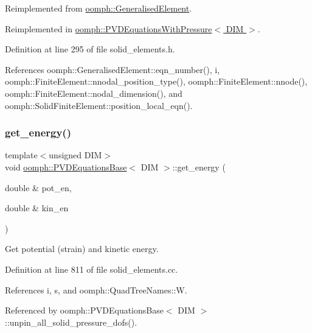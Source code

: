 Reimplemented from \hyperlink{classoomph_1_1GeneralisedElement_a069f59bfc3e607a5bebba52c6314d777}{oomph\+::\+Generalised\+Element}.



Reimplemented in \hyperlink{classoomph_1_1PVDEquationsWithPressure_a46331a93e6ac8cff7b4badad1c7a7a03}{oomph\+::\+P\+V\+D\+Equations\+With\+Pressure$<$ D\+I\+M $>$}.



Definition at line 295 of file solid\+\_\+elements.\+h.



References oomph\+::\+Generalised\+Element\+::eqn\+\_\+number(), i, oomph\+::\+Finite\+Element\+::nnodal\+\_\+position\+\_\+type(), oomph\+::\+Finite\+Element\+::nnode(), oomph\+::\+Finite\+Element\+::nodal\+\_\+dimension(), and oomph\+::\+Solid\+Finite\+Element\+::position\+\_\+local\+\_\+eqn().

\mbox{\label{classoomph_1_1PVDEquationsBase_a117549617e09065f0186e79cf9470e09}} 
\subsubsection{\texorpdfstring{get\+\_\+energy()}{get\_energy()}}
{\footnotesize\ttfamily template$<$unsigned D\+IM$>$ \\
void \hyperlink{classoomph_1_1PVDEquationsBase}{oomph\+::\+P\+V\+D\+Equations\+Base}$<$ D\+IM $>$\+::get\+\_\+energy (\begin{DoxyParamCaption}\item[{double \&}]{pot\+\_\+en,  }\item[{double \&}]{kin\+\_\+en }\end{DoxyParamCaption})}



Get potential (strain) and kinetic energy. 



Definition at line 811 of file solid\+\_\+elements.\+cc.



References i, s, and oomph\+::\+Quad\+Tree\+Names\+::W.



Referenced by oomph\+::\+P\+V\+D\+Equations\+Base$<$ D\+I\+M $>$\+::unpin\+\_\+all\+\_\+solid\+\_\+pressure\+\_\+dofs().

